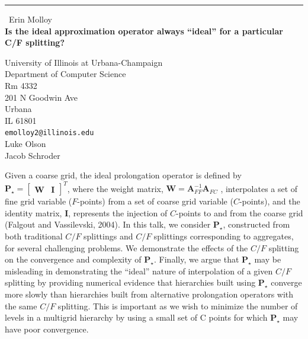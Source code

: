 \documentclass{report}
\begin{document}
\begin{center}
\rule{6in}{1pt} \
{\large Erin Molloy \\
{\bf Is the ideal approximation operator always ``ideal'' for a particular C/F splitting?}}

University of Illinois at Urbana-Champaign \\ Department of Computer Science \\ Rm 4332 \\ 201 N Goodwin Ave \\ Urbana \\ IL 61801
\\
{\tt emolloy2@illinois.edu}\\
Luke Olson\\
Jacob Schroder\end{center}

Given a coarse grid, the ideal prolongation operator is defined by
$\mathbf{P}_\star = \begin{bmatrix} \mathbf{W} & \mathbf{I} \end{bmatrix}^T$,
where the weight matrix, $\mathbf{W} = \mathbf{A}_{FF}^{-1} \mathbf{A}_{FC}$ ,
interpolates a set of fine grid variable ($F$-points) from a set of coarse grid variable
($C$-points), and the identity matrix, $\mathbf{I}$, represents the
injection of $C$-points to and from the coarse grid (Falgout and
Vassilevski, 2004).
In this talk, we consider $\mathbf{P}_\star$, constructed from
both traditional $C/F$ splittings and $C/F$ splittings corresponding to
aggregates, for several challenging problems. We demonstrate the effects of the
$C/F$ splitting on the convergence and complexity of $\mathbf{P}_\star$.
Finally, we argue that $\mathbf{P}_\star$ may be misleading in demonstrating the
``ideal'' nature of interpolation of a given $C/F$ splitting by providing
numerical evidence that hierarchies built using $\mathbf{P}_\star$
converge more slowly
than hierarchies built from alternative prolongation operators with the
same $C/F$ splitting. This is important as we wish to minimize the number
of levels in
a multigrid hierarchy by using a small set of C points for which $\mathbf{P}_\star$
may have poor convergence.
\end{document}
